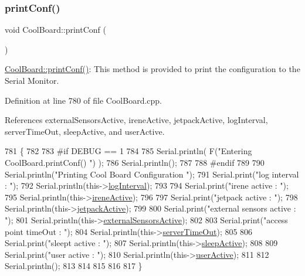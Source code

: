 \mbox{\label{classCoolBoard_a486507b8f0981d3cc671ed31c2145755}} 
\subsubsection{\texorpdfstring{print\+Conf()}{printConf()}}
{\footnotesize\ttfamily void Cool\+Board\+::print\+Conf (\begin{DoxyParamCaption}{ }\end{DoxyParamCaption})}

\hyperlink{classCoolBoard_a486507b8f0981d3cc671ed31c2145755}{Cool\+Board\+::print\+Conf()}\+: This method is provided to print the configuration to the Serial Monitor. 

Definition at line 780 of file Cool\+Board.\+cpp.



References external\+Sensors\+Active, irene\+Active, jetpack\+Active, log\+Interval, server\+Time\+Out, sleep\+Active, and user\+Active.


\begin{DoxyCode}
781 \{
782 
783 \textcolor{preprocessor}{#if DEBUG == 1}
784     
785     Serial.println( F(\textcolor{stringliteral}{"Entering CoolBoard.printConf() "}) );
786     Serial.println();
787 
788 \textcolor{preprocessor}{#endif}
789 
790     Serial.println(\textcolor{stringliteral}{"Printing Cool Board Configuration "});
791     Serial.print(\textcolor{stringliteral}{"log interval      : "});
792     Serial.println(this->\hyperlink{classCoolBoard_a84bc94413b64973e4aba8c467c97006c}{logInterval});
793 
794     Serial.print(\textcolor{stringliteral}{"irene active      : "});
795     Serial.println(this->\hyperlink{classCoolBoard_a9c3f7ac625481ee2ae802a25d97a4ae0}{ireneActive});
796 
797     Serial.print(\textcolor{stringliteral}{"jetpack active        : "});
798     Serial.println(this->\hyperlink{classCoolBoard_a9be03a913d26e558328935ca3b59a75e}{jetpackActive});
799 
800     Serial.print(\textcolor{stringliteral}{"external sensors active   : "});
801     Serial.println(this->\hyperlink{classCoolBoard_a638b00b76aeb819ecfd4c10b8cdd7bb7}{externalSensorsActive});
802 
803     Serial.print(\textcolor{stringliteral}{"access point timeOut  : "});
804     Serial.println(this->\hyperlink{classCoolBoard_a7a8d8d3d316220cdd049cd63c1aa8fe6}{serverTimeOut});
805 
806     Serial.print(\textcolor{stringliteral}{"sleept active         : "});
807     Serial.println(this->\hyperlink{classCoolBoard_a0a51b2287139f66c738101fb53139230}{sleepActive});
808 
809     Serial.print(\textcolor{stringliteral}{"user active       : "});
810     Serial.println(this->\hyperlink{classCoolBoard_a6395459131d6889a3005f79c7a35e964}{userActive});
811 
812     Serial.println();
813 
814 
815 
816 
817 \}
\end{DoxyCode}
\mbox{\label{classCoolBoard_ad03abdce2e65f520bbf2cff0f2d083cf}} 
